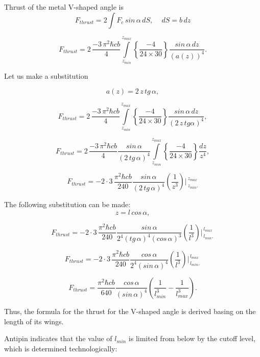 \documentclass[twoside, 10pt, ptm]{article}
\begin{document}
\begin{multicols}{2}
Thrust of the metal \mbox{V-shaped} angle is
\noindent
\begin{equation}F_{thrust} = 2 \int F_{c} \, sin\, \alpha \,dS, \,\,\,\,\,\,\, dS = b\,dz\end{equation}

\noindent
\begin{equation}F_{thrust} = 2\, \frac{-3\,\pi^2\hbar c b}{4}\int\limits_{z_{min}}^{z_{max}} \left\{\frac{-4}{24\times30}\right\}\frac{sin\, \alpha\,dz}{\left(a\left(z\right)\right)^4}.\end{equation}

Let us make a substitution

\[a\left(z\right) = 2\,z\,tg\, \alpha,\]

\[F_{thrust} = 2\, \frac{-3\,\pi^2\hbar c b}{4}\int\limits_{z_{min}}^{z_{max}} \left\{\frac{-4}{24\times30}\right\}\frac{sin\, \alpha\,dz}{\left(2\,z\,tg \alpha\right)^4},\]

\[F_{thrust} = 2\, \frac{-3\,\pi^2\hbar c b}{4} \frac{sin\, \alpha}{\left(2\,tg\, \alpha\right)^4} \int\limits_{z_{min}}^{z_{max}} \left\{\frac{-4}{24\times30}\right\} \frac{dz}{z^4},\]

\[F_{thrust} = -2\cdot3\, \frac{\pi^2\hbar c b}{240} \frac{sin\, \alpha}{\left(2\,tg\, \alpha\right)^4} \left(\frac{1}{z^3}\right)\Bigg\rvert_{\,z_{min}.}^{\,z_{max}} \]

    The following substitution can be made: \[z = l\, cos\, \alpha,\]

\[F_{thrust} = -2\cdot3\, \frac{\pi^2\hbar c b}{240} \frac{sin\, \alpha}{2^4\left(tg\,\alpha\right)^4\left(cos\, \alpha\right)^3} \left(\frac{1}{l^3}\right)\Bigg\rvert_{\,l_{min},}^{\,l_{max}} \]

\[F_{thrust} = -2\cdot3\, \frac{\pi^2\hbar c b}{240} \frac{cos\, \alpha}{2^4\left(sin\, \alpha\right)^4} \left(\frac{1}{l^3}\right)\Bigg\rvert_{\,l_{min},}^{\,l_{max}} \]

\noindent
\begin{equation}F_{thrust} = \frac{\pi^2\hbar c b}{640} \frac{cos\, \alpha}{\left(sin\, \alpha\right)^4} \left(\frac{1}{l_{min}^3} - \frac{1}{l_{max}^3}\right).\end{equation}

Thus, the formula for the thrust for the \mbox{V-shaped} angle is derived basing on the
length of its wings.

Antipin indicates that the value of \(l_{min}\) is limited from below by
the {\glqq}cutoff{\grqq} level, which is determined technologically:


\end{multicols}
\end{document}
